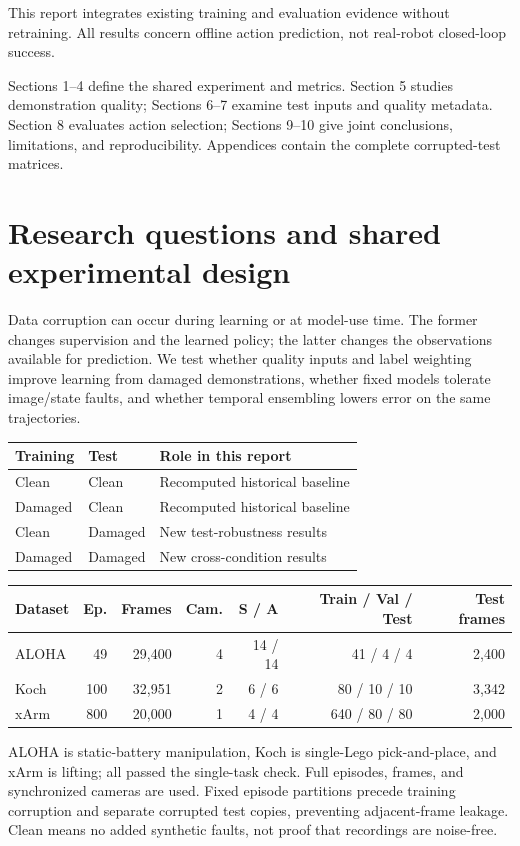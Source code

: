 \documentclass[11pt,a4paper]{article}
\newcommand{\note}[1]{\begin{tcolorbox}[colback=panel,colframe=rule,boxrule=0.5pt,arc=1mm]#1\end{tcolorbox}}
\begin{document}
\vfill\note{This report integrates existing training and evaluation evidence without retraining. All results concern offline action prediction, not real-robot closed-loop success.}
\clearpage\begingroup\setlength{\parskip}{0pt}\tableofcontents\endgroup
\vspace{8mm}\note{Sections 1--4 define the shared experiment and metrics. Section 5 studies demonstration quality; Sections 6--7 examine test inputs and quality metadata. Section 8 evaluates action selection; Sections 9--10 give joint conclusions, limitations, and reproducibility. Appendices contain the complete corrupted-test matrices.}
\clearpage\section{Research questions and shared experimental design}
Data corruption can occur during learning or at model-use time. The former changes supervision and the learned policy; the latter changes the observations available for prediction. We test whether quality inputs and label weighting improve learning from damaged demonstrations, whether fixed models tolerate image/state faults, and whether temporal ensembling lowers error on the same trajectories.

\begin{center}
\small
\begin{tabular}{llp{94mm}}
\toprule
Training & Test & Role in this report \\
\midrule
Clean & Clean & Recomputed historical baseline \\
Damaged & Clean & Recomputed historical baseline \\
Clean & Damaged & New test-robustness results \\
Damaged & Damaged & New cross-condition results \\
\bottomrule
\end{tabular}
\end{center}\begin{center}
\footnotesize
\begin{tabular}{lrrrrrr}
\toprule
Dataset & Ep. & Frames & Cam. & S / A & Train / Val / Test & Test frames \\
\midrule
ALOHA & 49 & 29,400 & 4 & 14 / 14 & 41 / 4 / 4 & 2,400 \\
Koch & 100 & 32,951 & 2 & 6 / 6 & 80 / 10 / 10 & 3,342 \\
xArm & 800 & 20,000 & 1 & 4 / 4 & 640 / 80 / 80 & 2,000 \\
\bottomrule
\end{tabular}
\end{center}ALOHA is static-battery manipulation, Koch is single-Lego pick-and-place, and xArm is lifting; all passed the single-task check. Full episodes, frames, and synchronized cameras are used. Fixed episode partitions precede training corruption and separate corrupted test copies, preventing adjacent-frame leakage. Clean means no added synthetic faults, not proof that recordings are noise-free.
\end{document}
